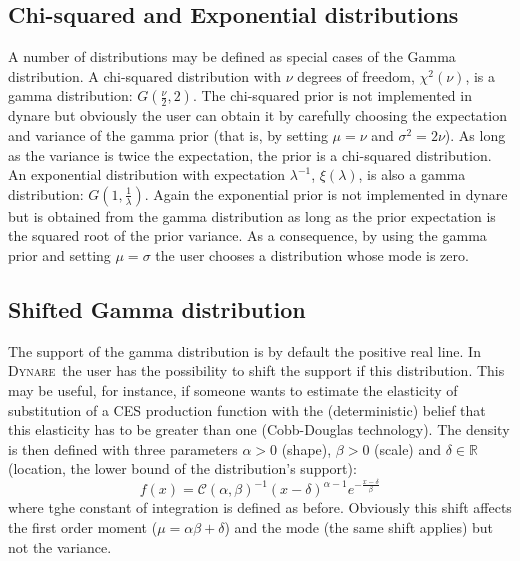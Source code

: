 \documentclass{amsart}
\theoremstyle{plain}
\theoremstyle{remark}
\numberwithin{equation}{section}
\newcommand{\Dynare}{\textsc{Dynare}}
\begin{document}
 \subsection{Chi-squared and Exponential distributions}\label{subsec:ChiAndExponentialDistributions}
 A number of distributions may be defined as special cases of the
 Gamma distribution. A chi-squared distribution with $\nu$ degrees of
 freedom, $\chi^2(\nu)$, is a gamma distribution:
 $G\left(\frac{\nu}{2},2\right)$. The chi-squared prior is not
 implemented in dynare but obviously the user can obtain it by
 carefully choosing the expectation and variance of the gamma prior
 (that is, by setting $\mu=\nu$ and $\sigma^2 = 2\nu$). As long as the
 variance is twice the expectation, the prior is a chi-squared
 distribution. An exponential distribution with expectation
 $\lambda^{-1}$, $\xi(\lambda)$, is also a gamma distribution:
 $G\left(1,\frac{1}{\lambda}\right)$. Again the exponential prior is
 not implemented in dynare but is obtained from the gamma distribution
 as long as the prior expectation is the squared root of the prior
 variance. As a consequence, by using the gamma prior and setting
 $\mu=\sigma$ the user chooses a distribution whose mode is zero.

 \subsection{Shifted Gamma distribution}\label{subsec:ShiftedGammaDistribution}
 The support of the gamma distribution is by default the positive real
 line. In \Dynare\ the user has the possibility to shift the support
 if this distribution. This may be useful, for instance, if someone
 wants to estimate the elasticity of substitution of a CES production
 function with the (deterministic) belief that this elasticity has to
 be greater than one (Cobb-Douglas technology). The density is then
 defined with three parameters $\alpha>0$ (shape), $\beta>0$ (scale)
 and $\delta\in\mathbb R$ (location, the lower bound of the
 distribution’s support):
 \[
   f(x) = \mathcal C(\alpha, \beta)^{-1}(x-\delta)^{\alpha-1}e^{-\frac{x-\delta}{\beta}}
 \]
 where tghe constant of integration is defined as before. Obviously
 this shift affects the first order moment ($\mu=\alpha\beta+\delta$)
 and the mode (the same shift applies) but not the variance.\newline
\end{document}
